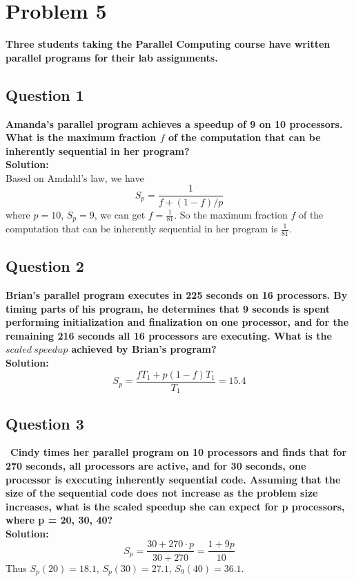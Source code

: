 \documentclass{article}
\begin{document}
\section{Problem 5}
\textcolor[rgb]{0,0,1}{\textbf{Three students taking the Parallel Computing course have written parallel 
programs for their lab assignments. }}\\
\subsection{Question 1}
\textcolor[rgb]{0,0,1}{\textbf{Amanda's parallel program achieves a speedup of 9 on 10 processors. What is the maximum fraction $f$ of the computation that can be inherently sequential in her program? }}\\
\textbf{Solution: }\\
Based on Amdahl's law, we have
$$S_{p} = \frac{1}{f+(1-f)/p}$$
where $p=10$, $S_{p}=9$, we can get $f=\frac{1}{81}$. So the maximum fraction $f$ of the computation that can be inherently sequential in her program is $\frac{1}{81}$.
\subsection{Question 2}
\textcolor[rgb]{0,0,1}{\textbf{Brian's parallel program executes in 225 seconds on 16 processors. By 
timing parts of his program, he determines that 9 seconds is spent performing initialization and finalization on one processor, and for the remaining 216 seconds all 16 processors are executing. What is the $scaled\ speedup$ achieved by Brian's program?}}\\
\textbf{Solution: }\\
$$S_{p}=\frac{fT_{1}+p(1-f)T_{1}}{T_{1}}=15.4$$
\subsection{Question 3}\
\textcolor[rgb]{0,0,1}{\textbf{Cindy times her parallel program on 10 processors and finds that for 270 
seconds, all processors are active, and for 30 seconds, one processor is executing inherently sequential code. Assuming that the size of the sequential code does not increase as the problem size increases, what is the scaled speedup she can expect for p processors, where p = 20, 30, 40? }}\\
\textbf{Solution: }\\
$$S_{p}=\frac{30+270\cdot p}{30+270}=\frac{1+9p}{10}$$
Thus $S_{p}(20)=18.1$, $S_{p}(30)=27.1$, $S_{9}(40)=36.1$.
\end{document}
